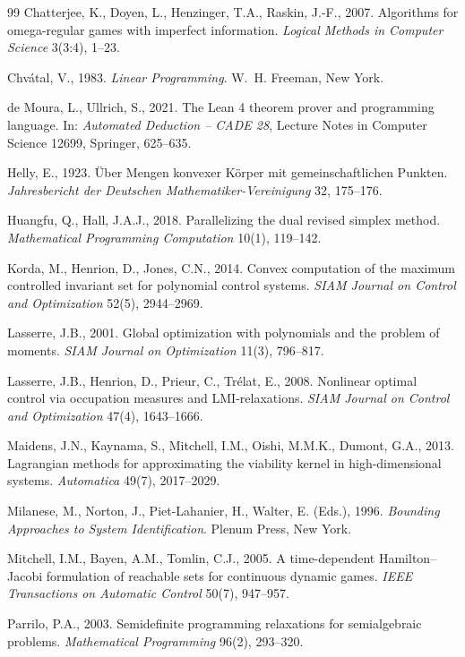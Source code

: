 \documentclass[11pt,a4paper]{article}
\theoremstyle{plain}
\theoremstyle{definition}
\theoremstyle{remark}
\begin{document}
\begin{thebibliography}{99}
 Chatterjee, K., Doyen, L., Henzinger, T.A., Raskin, J.-F., 2007. Algorithms for omega-regular games with imperfect information. \emph{Logical Methods in Computer Science} 3(3:4), 1--23.

 Chv\'atal, V., 1983. \emph{Linear Programming}. W.~H. Freeman, New York.

 de Moura, L., Ullrich, S., 2021. The Lean 4 theorem prover and programming language. In: \emph{Automated Deduction -- CADE 28}, Lecture Notes in Computer Science 12699, Springer, 625--635.

 Helly, E., 1923. \"Uber Mengen konvexer K\"orper mit gemeinschaftlichen Punkten. \emph{Jahresbericht der Deutschen Mathematiker-Vereinigung} 32, 175--176.

 Huangfu, Q., Hall, J.A.J., 2018. Parallelizing the dual revised simplex method. \emph{Mathematical Programming Computation} 10(1), 119--142.

 Korda, M., Henrion, D., Jones, C.N., 2014. Convex computation of the maximum controlled invariant set for polynomial control systems. \emph{SIAM Journal on Control and Optimization} 52(5), 2944--2969.

 Lasserre, J.B., 2001. Global optimization with polynomials and the problem of moments. \emph{SIAM Journal on Optimization} 11(3), 796--817.

 Lasserre, J.B., Henrion, D., Prieur, C., Tr\'elat, E., 2008. Nonlinear optimal control via occupation measures and LMI-relaxations. \emph{SIAM Journal on Control and Optimization} 47(4), 1643--1666.

 Maidens, J.N., Kaynama, S., Mitchell, I.M., Oishi, M.M.K., Dumont, G.A., 2013. Lagrangian methods for approximating the viability kernel in high-dimensional systems. \emph{Automatica} 49(7), 2017--2029.

 Milanese, M., Norton, J., Piet-Lahanier, H., Walter, E. (Eds.), 1996. \emph{Bounding Approaches to System Identification}. Plenum Press, New York.

 Mitchell, I.M., Bayen, A.M., Tomlin, C.J., 2005. A time-dependent Hamilton--Jacobi formulation of reachable sets for continuous dynamic games. \emph{IEEE Transactions on Automatic Control} 50(7), 947--957.

 Parrilo, P.A., 2003. Semidefinite programming relaxations for semialgebraic problems. \emph{Mathematical Programming} 96(2), 293--320.


\end{thebibliography}
\end{document}
